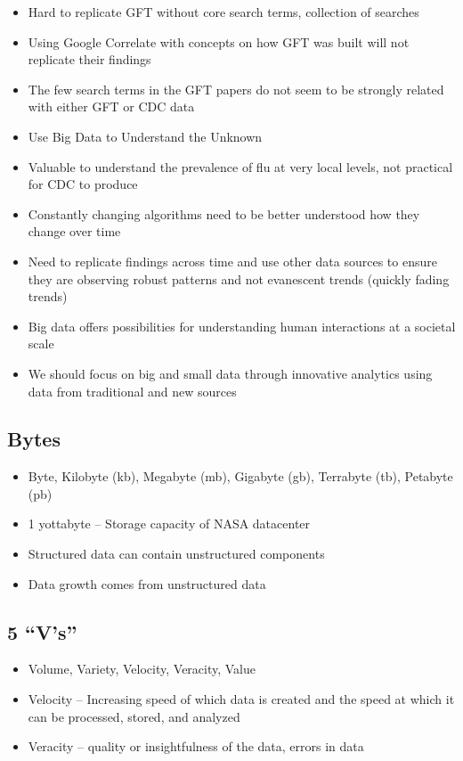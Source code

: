 \documentclass[
]{book}
\providecommand{\tightlist}{%
  \setlength{\itemsep}{0pt}\setlength{\parskip}{0pt}}
\begin{document}
\begin{itemize}
\item
  Hard to replicate GFT without core search terms, collection of searches
\item
  Using Google Correlate with concepts on how GFT was built will not replicate their findings
\item
  The few search terms in the GFT papers do not seem to be strongly related with either GFT or CDC data
\item
  Use Big Data to Understand the Unknown
\item
  Valuable to understand the prevalence of flu at very local levels, not practical for CDC to produce
\item
  Constantly changing algorithms need to be better understood how they change over time
\item
  Need to replicate findings across time and use other data sources to ensure they are observing robust patterns and not evanescent trends (quickly fading trends)
\item
  Big data offers possibilities for understanding human interactions at a societal scale
\item
  We should focus on big and small data through innovative analytics using data from traditional and new sources
\end{itemize}

\subsection{Bytes}\label{bytes}

\begin{itemize}
\tightlist
\item
  Byte, Kilobyte (kb), Megabyte (mb), Gigabyte (gb), Terrabyte (tb), Petabyte (pb)
\item
  1 yottabyte -- Storage capacity of NASA datacenter
\item
  Structured data can contain unstructured components
\item
  Data growth comes from unstructured data
\end{itemize}

\subsection{5 ``V's''}\label{vs}

\begin{itemize}
\tightlist
\item
  Volume, Variety, Velocity, Veracity, Value
\item
  Velocity -- Increasing speed of which data is created and the speed at which it can be processed, stored, and analyzed
\item
  Veracity -- quality or insightfulness of the data, errors in data
\end{itemize}
\end{document}
